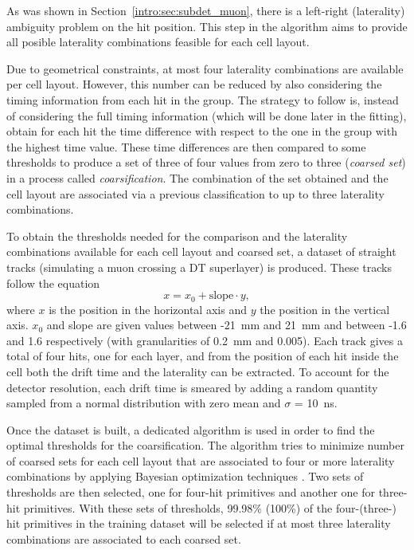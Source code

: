 \documentclass[../main.tex]{subfiles}
\begin{document}
As was shown in Section~\ref{intro:sec:subdet_muon}, there is a left-right (laterality) ambiguity problem on the hit position. This step in the algorithm aims to provide all posible laterality combinations feasible for each cell layout. 

Due to geometrical constraints, at most four laterality combinations are available per cell layout. However, this number can be reduced by also considering the timing information from each hit in the group. The strategy to follow is, instead of considering the full timing information (which will be done later in the fitting), obtain for each hit the time difference with respect to the one in the group with the highest time value. These time differences are then compared to some thresholds to produce a set of three of four values from zero to three (\textit{coarsed set}) in a process called \textit{coarsification}. The combination of the set obtained and the cell layout are associated via a previous classification to up to three laterality combinations. 

To obtain the thresholds needed for the comparison and the laterality combinations available for each cell layout and coarsed set, a dataset of straight tracks (simulating a muon crossing a DT superlayer) is produced. These tracks follow the equation
\begin{equation}
x = x_0 + \text{slope} \cdot y,
\end{equation}
where $x$ is the position in the horizontal axis and $y$ the position in the vertical axis. $x_0$ and slope are given values between -21~mm and 21~mm and between -1.6 and 1.6 respectively (with granularities of 0.2~mm and 0.005). Each track gives a total of four hits, one for each layer, and from the position of each hit inside the cell both the drift time and the laterality can be extracted. To account for the detector resolution, each drift time is smeared by adding a random quantity sampled from a normal distribution with zero mean and $\sigma$ = 10~ns. 

Once the dataset is built, a dedicated algorithm is used in order to find the optimal thresholds for the coarsification. The algorithm tries to minimize number of coarsed sets for each cell layout that are associated to four or more laterality combinations by applying Bayesian optimization techniques \cite{dts:bayes, dts:bayes_python}. Two sets of thresholds are then selected, one for four-hit primitives and another one for three-hit primitives. With these sets of thresholds, 99.98\% (100\%) of the four-(three-) hit primitives in the training dataset will be selected if at most three laterality combinations are associated to each coarsed set.
\end{document}
